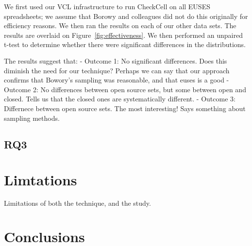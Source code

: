 \documentclass{sig-alternate} %
\begin{document}
We first used our VCL infrastructure to run CheckCell on all EUSES spreadsheets; we assume
that Borowy and colleagues did not do this originally for efficiency reasons.
We then ran the results on each of our other data sets.
The results are overlaid on Figure~\ref{fig:effectiveness}.
We then performed an unpaired t-test to determine whether there were significant differences
in the distributions.

The results suggest that:
- Outcome 1: No significant differences. Does this diminish the need for our technique?
	Perhaps we can say that our approach confirms that Bowory's sampling was reasonable,
	and that euses is a good 
- Outcome 2: No differences between open source sets, but some between open and closed. 
	Tells us that the closed ones are systematically different.
- Outcome 3: Differnece between open source sets. The most interesting! Says something about
	sampling methods.

\subsection{RQ3}

\section{Limtations}

Limitations of both the technique, and the study.

\section{Conclusions}
\end{document}
